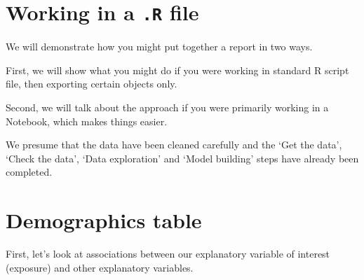\documentclass[
  12pt,
  krantz2]{krantz}
\makeatletter
\newenvironment{Shaded}{\begin{snugshade}}{\end{snugshade}}
\newcommand{\CommentTok}[1]{\textcolor[rgb]{0.56,0.35,0.01}{\textit{#1}}}
\newcommand{\DataTypeTok}[1]{\textcolor[rgb]{0.13,0.29,0.53}{#1}}
\newcommand{\KeywordTok}[1]{\textcolor[rgb]{0.13,0.29,0.53}{\textbf{#1}}}
\newcommand{\NormalTok}[1]{#1}
\newcommand{\OperatorTok}[1]{\textcolor[rgb]{0.81,0.36,0.00}{\textbf{#1}}}
\newcommand{\OtherTok}[1]{\textcolor[rgb]{0.56,0.35,0.01}{#1}}
\newcommand{\StringTok}[1]{\textcolor[rgb]{0.31,0.60,0.02}{#1}}
\newenvironment{kframe}{%
\medskip{}
\setlength{\fboxsep}{.8em}
 \def\at@end@of@kframe{}%
 \ifinner\ifhmode%
  \def\at@end@of@kframe{\end{minipage}}%
  \begin{minipage}{\columnwidth}%
 \fi\fi%
 \def\FrameCommand##1{\hskip\@totalleftmargin \hskip-\fboxsep
 \colorbox{shadecolor}{##1}\hskip-\fboxsep
     \hskip-\linewidth \hskip-\@totalleftmargin \hskip\columnwidth}%
 \MakeFramed {\advance\hsize-\width
   \@totalleftmargin\z@ \linewidth\hsize
   \@setminipage}}%
 {\par\unskip\endMakeFramed%
 \at@end@of@kframe}
\renewenvironment{Shaded}{\begin{kframe}}{\end{kframe}}
\makeatother
\begin{document}
\hypertarget{working-in-a-.r-file}{%
\section{\texorpdfstring{Working in a \texttt{.R} file}{Working in a .R file}}\label{working-in-a-.r-file}}

We will demonstrate how you might put together a report in two ways.

First, we will show what you might do if you were working in standard R script file, then exporting certain objects only.

Second, we will talk about the approach if you were primarily working in a Notebook, which makes things easier.

We presume that the data have been cleaned carefully and the `Get the data', `Check the data', `Data exploration' and `Model building' steps have already been completed.

\hypertarget{demographics-table}{%
\section{Demographics table}\label{demographics-table}}

First, let's look at associations between our explanatory variable of interest (exposure) and other explanatory variables.

\begin{Shaded}
\end{Shaded}
\end{document}
